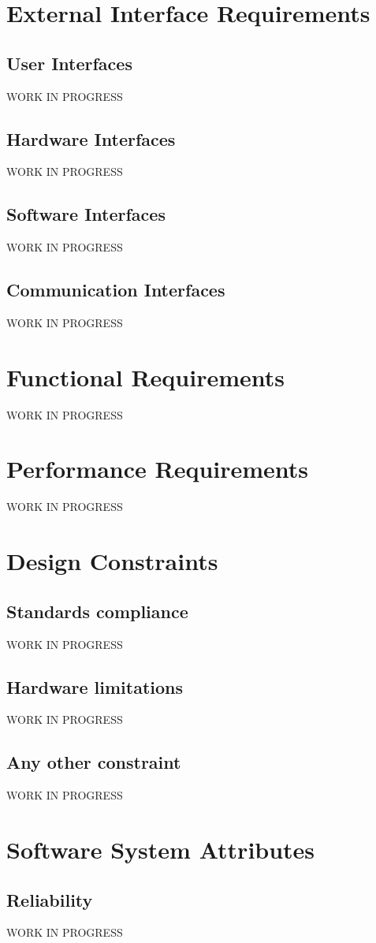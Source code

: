 \documentclass{report}
\begin{document}
		\section{External Interface Requirements}
			\subsection{User Interfaces}
			WORK IN PROGRESS
			\subsection{Hardware Interfaces}
			WORK IN PROGRESS
			\subsection{Software Interfaces}
			WORK IN PROGRESS
			\subsection{Communication Interfaces}
			WORK IN PROGRESS
		\section{Functional Requirements}
		WORK IN PROGRESS
		\section{Performance Requirements}
		WORK IN PROGRESS
		\section{Design Constraints}
			\subsection{Standards compliance}
			WORK IN PROGRESS
			\subsection{Hardware limitations}
			WORK IN PROGRESS
			\subsection{Any other constraint}
			WORK IN PROGRESS
		\section{Software System Attributes}
			\subsection{Reliability}
			WORK IN PROGRESS
\end{document}
